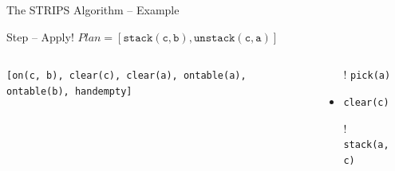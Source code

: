 \documentclass[presentation]{beamer}\mode<presentation>{\usetheme{AMSBolognaFC}}
\begin{document}
\begin{frame}[c]{The STRIPS Algorithm -- Example}
\small

\begin{exampleblock}{Step \nextStripsExampleStep{} -- Apply! \hfill $Plan = [\mathtt{stack(c,b),unstack(c,a)}]$}
    \begin{columns}[t]
        \begin{column}{.30\linewidth}\centering
            \texttt{[on(c, b), clear(c), clear(a), ontable(a), ontable(b), handempty]}
        \end{column}
        \begin{column}{.50\linewidth}\centering
            \begin{itemize}
                \item[!] \texttt{pick(a)}
                \item \texttt{clear(c)}
                \item[!] \texttt{stack(a,c)}
            \end{itemize}
        \end{column}
        \begin{column}{.10\linewidth}\centering
            
        \end{column}
    \end{columns}
\end{exampleblock}

\end{frame}
\end{document}
